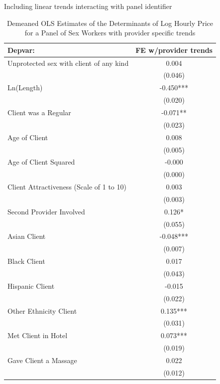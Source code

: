 \documentclass{beamer}
\begin{document}
\begin{frame}{Including linear trends interacting with panel identifier}

	
\begin{table}[htbp]\centering
\tiny
\caption{Demeaned OLS Estimates of the Determinants of Log Hourly Price for a Panel of Sex Workers with provider specific trends}
\label{sasp}
\begin{center}
\begin{threeparttable}
\begin{tabular}{l*{1}{c}}
\toprule
\multicolumn{1}{l}{\textbf{Depvar:}}&
\multicolumn{1}{c}{\textbf{FE w/provider trends}}\\
\midrule
Unprotected sex with client of any kind&       0.004   \\
                    &     (0.046)   \\
Ln(Length)          &      -0.450***\\
                    &     (0.020)   \\
Client was a Regular&      -0.071** \\
                    &     (0.023)   \\
Age of Client       &       0.008   \\
                    &     (0.005)   \\
Age of Client Squared&      -0.000   \\
                    &     (0.000)   \\
Client Attractiveness (Scale of 1 to 10)&       0.003   \\
                    &     (0.003)   \\
Second Provider Involved&       0.126*  \\
                    &     (0.055)   \\
Asian Client        &      -0.048***\\
                    &     (0.007)   \\
Black Client        &       0.017   \\
                    &     (0.043)   \\
Hispanic Client     &      -0.015   \\
                    &     (0.022)   \\
Other Ethnicity Client&       0.135***\\
                    &     (0.031)   \\
Met Client in Hotel &       0.073***\\
                    &     (0.019)   \\
Gave Client a Massage&       0.022   \\
                    &     (0.012)   \\
\end{tabular}
\end{threeparttable}
\end{center}
\end{table}

	
 	
\end{frame}
\end{document}
